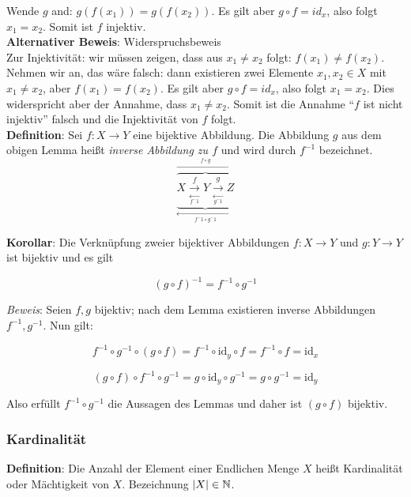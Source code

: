 \documentclass{article}
\begin{document}
Wende $g$ and: $g(f(x_1)) = g(f(x_2))$. Es gilt aber $g \circ f = id_x$, also folgt $x_1 = x_2$. Somit ist $f$ injektiv. \\

\textbf{Alternativer Beweis}: Widerspruchsbeweis \\

Zur Injektivität: wir müssen zeigen, dass aus $x_1 \ne x_2$ folgt: $f(x_1) \ne f(x_2)$. Nehmen wir an, das wäre falsch:
dann existieren zwei Elemente $x_1, x_2 \in X$ mit $x_1 \ne x_2$, aber $f(x_1) = f(x_2)$.
Es gilt aber $g \circ f = id_x$, also folgt $x_1 = x_2$. Dies widerspricht aber der Annahme, dass $x_1 \ne x_2$.
Somit ist die Annahme ``$f$ ist nicht injektiv'' falsch und die Injektivität von $f$ folgt. \\

\textbf{Definition}: Sei $f \colon X \to Y$ eine bijektive Abbildung. Die Abbildung $g$ aus dem obigen Lemma
heißt \emph{inverse Abbildung zu $f$} und wird durch $f^{-1}$ bezeichnet. \\

\[
  \underbrace{
    \overbrace{
      X
        \underset{\underset{f^-1}\longleftarrow}{\overset{f}\to}
      Y
        \underset{\underset{g^-1}\longleftarrow}{\overset{g}\to}
      Z
    }^{\overset{f \circ g}\longrightarrow}
  }_{\underset{f^-1 \circ g^-1}\longleftarrow}
\]

\textbf{Korollar}: Die Verknüpfung zweier bijektiver Abbildungen $f \colon X \to Y$ und $g \colon Y \to Y$
ist bijektiv und es gilt

\[
  (g \circ f)^{-1} = f^{-1} \circ g^{-1}
\]

\emph{Beweis}: Seien $f, g$ bijektiv; nach dem Lemma existieren inverse Abbildungen $f^{-1}, g^{-1}$.
Nun gilt:

\[
  f^{-1} \circ g^{-1} \circ (g \circ f) = f^{-1} \circ \text{id}_y \circ f = f^{-1} \circ f = \text{id}_x
\]

\[
  (g \circ f) \circ f^{-1} \circ g^{-1} = g \circ \text{id}_y \circ g^{-1} = g \circ g^{-1} = \text{id}_y
\]

Also erfüllt $f^{-1} \circ g^{-1}$ die Aussagen des Lemmas und daher ist $(g \circ f)$ bijektiv.

\subsubsection*{Kardinalität}

\textbf{Definition}: Die Anzahl der Element einer Endlichen Menge $X$ heißt Kardinalität oder Mächtigkeit
von $X$. Bezeichnung $\abs{X} \in \mathbb{N}$.
\end{document}
